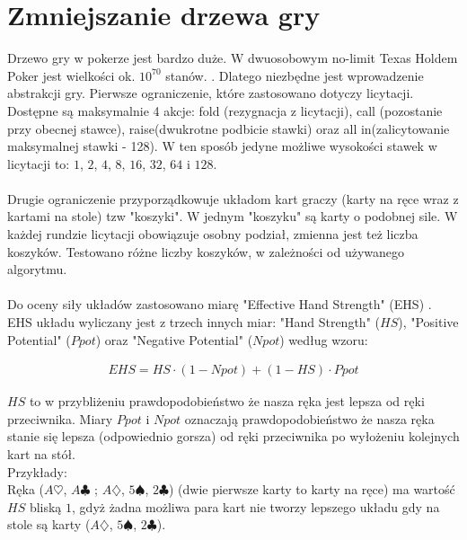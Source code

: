 \documentclass[licencjacka]{pracamgr}
\begin{document}
\section{Zmniejszanie drzewa gry}

Drzewo gry w pokerze jest bardzo duże. W dwuosobowym no-limit Texas Holdem Poker jest wielkości
ok. $10^{70}$ stanów. \cite{monte-carlo}. Dlatego niezbędne jest wprowadzenie abstrakcji gry.
Pierwsze ograniczenie, które zastosowano dotyczy licytacji. Dostępne są maksymalnie 4 akcje:
fold (rezygnacja z licytacji), call (pozostanie przy obecnej stawce), raise(dwukrotne podbicie stawki) oraz
all in(zalicytowanie maksymalnej stawki - 128). W ten sposób jedyne możliwe wysokości stawek w licytacji to: $1$, $2$,
$4$, $8$, $16$, $32$, $64$ i $128$. \\\\
\noindent
Drugie ograniczenie przyporządkowuje układom kart graczy (karty na ręce wraz z kartami na stole) tzw "koszyki". \cite[sekcja 4.4]{buckets}
W jednym "koszyku" są karty o podobnej sile. W każdej rundzie licytacji obowiązuje osobny podział, zmienna
jest też liczba koszyków. Testowano różne liczby koszyków, w zależności od używanego algorytmu. \\\\
\noindent
Do oceny siły układów zastosowano miarę "Effective Hand Strength" (EHS) \cite{ehs}. EHS układu wyliczany
jest z trzech innych miar: "Hand Strength" ($HS$), "Positive Potential" ($Ppot$) oraz "Negative Potential" ($Npot$) według
wzoru:

\begin{align*}
EHS = HS \cdot (1 - Npot) + (1 - HS) \cdot Ppot
\end{align*}

\noindent
$HS$ to w przybliżeniu prawdopodobieństwo że nasza ręka jest lepsza od ręki przeciwnika. Miary $Ppot$ i $Npot$ oznaczają
prawdopodobieństwo że nasza ręka stanie się lepsza (odpowiednio gorsza) od ręki przeciwnika po wyłożeniu kolejnych kart na stół. \\

\noindent
Przykłady: \\

\noindent
Ręka ($A\heartsuit$, $A\clubsuit$ ; $A\diamondsuit$, $5\spadesuit$, $2\clubsuit$) (dwie pierwsze karty to karty na ręce) ma wartość $HS$
bliską $1$, gdyż żadna możliwa para kart nie tworzy lepszego układu gdy na stole są karty ($A\diamondsuit$, $5\spadesuit$, $2\clubsuit$). \\
\end{document}
